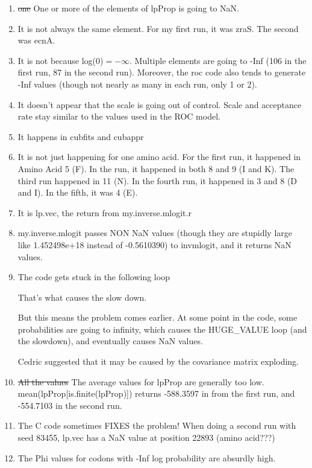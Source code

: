 \begin{enumerate}
\item \sout{one} One or more of the elements of lpProp is going to NaN.
\item It is not always the same element. For my first run, it was zraS. The second was ecnA.
\item It is not because log(0)$= -\infty$. Multiple elements are going to -Inf (106 in the first run,  87 in the second run). Moreover, the roc code also tends to generate -Inf values (though not nearly as many in each run, only 1 or 2).
\item It doesn't appear that the scale is going out of control. Scale and acceptance rate stay similar to the values used in the ROC model.
\item It happens in cubfits and cubappr
\item It is not just happening for one amino acid. For the first run, it happened in Amino Acid 5 (F). In the run, it happened in both 8 and 9 (I and K). The third run happened in 11 (N). In the fourth run, it happened in 3 and 8 (D and I). In the fifth, it was 4 (E).
\item It is lp.vec, the return from my.inverse.mlogit.r
\item my.inverse.mlogit passes NON NaN values (though they are stupidly large like 1.452498e+18 instead of -0.5610390) to invmlogit, and it returns NaN values.
\item The code gets stuck in the following loop



That's what causes the slow down.

But this means the problem comes earlier. At some point in the code, some probabilities are going to infinity, which causes the HUGE\_VALUE loop (and the slowdown), and eventually causes NaN values.

Cedric suggested that it may be caused by the covariance matrix exploding.

\item \sout{All the values} The average values for lpProp are generally too low.\\
mean(lpProp[is.finite(lpProp)]) returns -588.3597 in from the first run, and -554.7103 in the second run.

\item The C code sometimes FIXES the problem! When doing a second run with seed 83455, lp.vec has a NaN value at position 22893 (amino acid???) 

\item The Phi values for codons with -Inf log probability are absurdly high.




\end{enumerate}


